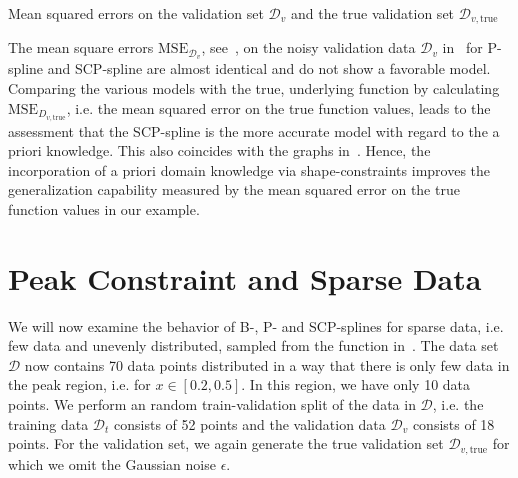 \begin{table}[H]
	\begin{center}
	\end{center}
	\caption{Mean squared errors on the validation set $\mathcal{D}_v$ and the true validation set $\mathcal{D}_{v,\mathrm{true}}$}
	\label{tab:test-func-peak-mses}
\end{table}
%
The mean square errors $\mathrm{MSE}_{\mathcal{D}_v}$, see~, on the noisy validation data $\mathcal{D}_v$ in~ for P-spline and SCP-spline are almost identical and do not show a favorable model. Comparing the various models with the true, underlying function by calculating $\text{MSE}_{D_{v,\mathrm{true}}}$, i.e. the mean squared error on the true function values, leads to the assessment that the SCP-spline is the more accurate model with regard to the a priori knowledge. This also coincides with the graphs in~. Hence, the incorporation of a priori domain knowledge via shape-constraints improves the generalization capability measured by the mean squared error on the true function values in our example. 

\section{Peak Constraint and Sparse Data} \label{sec:peak-behav-sparse}

We will now examine the behavior of B-, P- and SCP-splines for sparse data, i.e. few data and unevenly distributed, sampled from the function in~. The data set $\mathcal{D}$ now contains 70 data points distributed in a way that there is only few data in the peak region, i.e. for $x \in [0.2, 0.5]$. In this region, we have only 10 data points. We perform an random train-validation split of the data in $\mathcal{D}$, i.e. the training data $\mathcal{D}_t$ consists of 52 points and the validation data $\mathcal{D}_v$ consists of 18 points. For the validation set, we again generate the true validation set $\mathcal{D}_{v, \mathrm{true}}$ for which we omit the Gaussian noise $\epsilon$.


